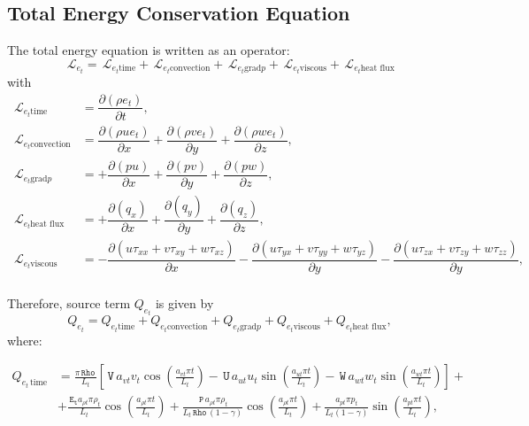 \documentclass[10pt]{article}
\newcommand{\Diff}[2] {\dfrac{\partial( #1)}{\partial #2}}
\newcommand{\Rho}{\,\mathtt{Rho}}
\newcommand{\PP}{\,\mathtt{P}}
\newcommand{\U}{\,\mathtt{U}}
\newcommand{\V}{\,\mathtt{V}}
\newcommand{\W}{\,\mathtt{W}}
\newcommand{\Lo}{\,\mathcal{L}}
\newcommand{\Et}{\,\mathtt{E_t}}
\newcommand{\convection}{\text{convection}}
\newcommand{\gradp}{\text{grad}p}
\newcommand{\viscous}{\text{viscous}}
\newcommand{\heatflux}{\text{heat flux}}
\begin{document}
\subsection{Total Energy Conservation Equation}
The total energy equation is written as an operator:
\begin{equation*}
 \label{eq:ns1d_14}
\Lo_{e_t} = \Lo_{e_t \text{time}} + \Lo_{e_t \convection} + \Lo_{e_t \gradp}+ \Lo_{e_t \viscous} + \Lo_{e_t \heatflux} 
\end{equation*}
with
\begin{equation*}
\begin{split}
\Lo_{e_t \text{time}}&= \Diff{\rho e_t}{t} ,\\
\Lo_{e_t \convection} &= \Diff{\rho u e_t}{x}+\Diff{\rho v e_t}{y}+\Diff{\rho we_t}{z},\\
\Lo_{e_t \gradp} &=+\Diff{pu}{x}+\Diff{pv}{y}+\Diff{pw}{z} ,\\
\Lo_{e_t \heatflux} &=+\Diff{q_x}{x} +\Diff{q_y}{y} +\Diff{q_z}{z},\\ 
\Lo_{e_t \viscous} &= -\Diff{u\tau_{xx}+v\tau_{xy}+w\tau_{xz}}{x}-\Diff{u\tau_{yx}+v\tau_{yy}+w\tau_{yz}}{y}-\Diff{u\tau_{zx}+v\tau_{zy}+w\tau_{zz}}{y},\\
 \end{split}
\end{equation*}

Therefore, source term $Q_{e_t}$ is given by
$$Q_{e_t} = Q_{e_t \text{time}} + Q_{e_t \convection} + Q_{e_t \gradp}+ Q_{e_t \viscous} + Q_{e_t \heatflux}, $$
where:

\begin{equation*}
 \begin{split}
 Q_{e_t \, \text{time}}&= 
\frac{\pi \Rho \, }{L_t} \left[\V \, a_{vt} v_{t} \cos\left(\frac{a_{vt} \pi t}{L_t}\right) - \U \, a_{ut} u_{t} \sin\left(\frac{a_{ut} \pi t}{L_t}\right) - \W \, a_{wt} w_{t} \sin\left(\frac{a_{wt} \pi t}{L_t}\right)\right] + \\ 
&+ \frac{\Et a_{\rho t} \pi \rho_{t} }{L_t}\cos\left(\frac{a_{\rho t} \pi t}{L_t}\right) + \frac{\PP \, a_{\rho t} \pi \rho_{t} }{L_t \Rho \, \left(1 - \gamma\right)}\cos\left(\frac{a_{\rho t} \pi t}{L_t}\right)+ \frac{a_{pt} \pi p_{t} }{L_t \left(1 - \gamma\right)}\sin\left(\frac{a_{pt} \pi t}{L_t}\right) 
,\\
 \end{split}
\end{equation*}
\end{document}
